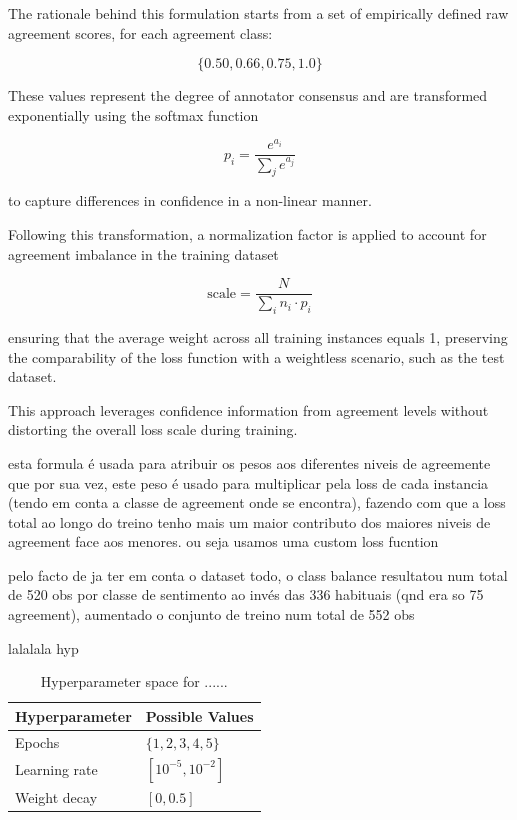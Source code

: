 \documentclass[conference]{IEEEtran}
\begin{document}
The rationale behind this formulation starts from a set of empirically defined raw agreement scores, for each agreement class:

$$
\{0.50, 0.66, 0.75, 1.0\}
$$

These values represent the degree of annotator consensus and are transformed exponentially using the softmax function

$$
p_i = \frac{e^{a_i}}{\sum_j e^{a_j}}
$$

\noindent to capture differences in confidence in a non-linear manner.

Following this transformation, a normalization factor is applied to account for agreement imbalance in the training dataset

$$
\text{scale} = \frac{N}{\sum_i n_i \cdot p_i}
$$

\noindent ensuring that the average weight across all training instances equals 1, preserving the comparability of the loss function with a weightless scenario, such as the test dataset.

This approach leverages confidence information from agreement levels without distorting the overall loss scale during training.

esta formula é usada para atribuir os pesos aos diferentes niveis de agreemente que por sua vez, este peso é usado para multiplicar pela loss de cada instancia (tendo em conta a classe de agreement onde se encontra), fazendo com que a loss total ao longo do treino tenho mais um maior contributo dos maiores niveis de agreement face aos menores. ou seja usamos uma custom loss fucntion

pelo facto de ja ter em conta o dataset todo, o class balance resultatou num total de 520 obs por classe de sentimento ao invés das 336 habituais (qnd era so 75 agreement), aumentado o conjunto de treino num total de 552 obs

lalalala hyp

\begin{table}[H]
\centering
\caption{Hyperparameter space for ......}
\label{parameters_basebert}
\begin{tabular}{ll}
\toprule
\textbf{Hyperparameter} & \textbf{Possible Values} \\
\midrule
Epochs & $\{1,2,3,4,5\}$ \\
Learning rate & $[10^{-5}, 10^{-2}]$ \\
Weight decay & $[0, 0.5]$ \\
\bottomrule
\end{tabular}
\end{table}
\end{document}
